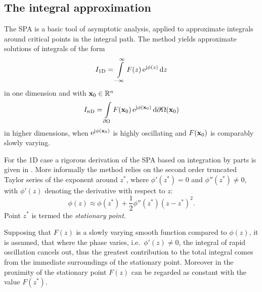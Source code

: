 \subsection{The integral approximation}
%
The SPA is a basic tool of asymptotic analysis, applied to approximate integrals around critical points in the integral path.
The method yields approximate solutions of integrals of the form
\begin{equation}
\label{Eq:SPAintegral_1d}
I_{1\mathrm{D}} = \int\limits_{-\infty}^{\infty} F(z) \, \mathrm{e}^{\mathrm{j} \phi(z)} \, \mathrm{d} z
\end{equation}
in one dimension and with $\mathbf{x}_0 \in \mathbb{R}^{n}$
\begin{equation}
\label{Eq:SPAintegral_nd}
I_{n\mathrm{D}} = \int\limits_{\partial \Omega} F(\mathbf{x}_0) \, \mathrm{e}^{\mathrm{j} \phi(\mathbf{x}_0)} \, \mathrm{d} \partial \Omega(\mathbf{x}_0)
\end{equation}
in higher dimensions, when $\mathrm{e}^{\mathrm{j} \phi(\mathbf{x}_0)}$ is highly oscillating and $F(\mathbf{x}_0)$ is comparably slowly varying.


For the 1D case a rigorous derivation of the SPA based on integration by parts is given in \cite{Bleistein1984, Blenstein1975, Williams1999}.
More informally the method relies on the second order truncated Taylor series of the exponent around $z^*$, where $\phi'(z^*) = 0$ and $\phi''(z^*) \neq 0$, with $\phi'(z)$ denoting the derivative with respect to $z$:
\begin{equation}
\phi(z) \approx \phi(z^*) + \frac{1}{2}\phi''(z^*)(z-z^*)^2.
\end{equation}
Point $z^*$ is termed the \emph{stationary point}.

Supposing that $F(z)$ is a slowly varying smooth function compared to $\phi(z)$, it is assumed, that where the phase varies, i.e.\ $\phi'(z) \neq 0$, the integral of rapid oscillation cancels out, thus the greatest contribution to the total integral comes from the immediate surroundings of the stationary point.
Moreover in the proximity of the stationary point $F(z)$ can be regarded as constant with the value $F(z^*)$.

